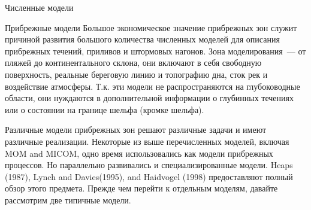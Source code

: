 \begin{chapter}{Численные модели}
\begin{section}{Прибрежные модели}
Большое экономическое значение прибрежных зон служит причиной развития
большого количества численных моделей для описания прибрежных течений,
приливов и штормовых нагонов. Зона моделирования~--- от пляжей до
континентального склона, они включают в себя свободную поверхность,
реальные береговую линию и топографию дна, сток рек и воздействие
атмосферы. Т.к. эти модели не распространяются на глубоководные
области, они нуждаются в дополнительной информации о глубинных
течениях или о состоянии на границе шельфа (кромке шельфа).
%

Различные модели прибрежных зон решают различные задачи и имеют
различные реализации. Некоторые из выше перечисленных моделей, включая
MOM and MICOM, одно время использовались как модели прибрежных
процессов. Но параллельно развивались и специализированные
модели. Heaps (1987), Lynch and Davies(1995), and Haidvogel (1998)
предоставляют полный обзор этого предмета. Прежде чем перейти к
отдельным моделям, давайте рассмотрим две типичные модели.
%


\end{section}
\end{chapter}
